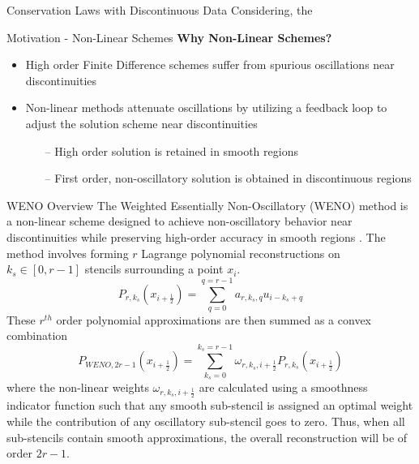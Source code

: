 \documentclass[9pt]{beamer}
\begin{document}
\begin{frame}{Conservation Laws with Discontinuous Data}
  Considering, the 
\end{frame}

\begin{frame}{Motivation - Non-Linear Schemes}
  \textbf{Why Non-Linear Schemes?}
  \begin{itemize}
  \item High order Finite Difference schemes suffer from spurious oscillations near discontinuities
  \item Non-linear methods attenuate oscillations by utilizing a feedback loop to adjust the solution scheme near discontinuities
  \begin{itemize}
  \item[--] High order solution is retained in smooth regions 
  \item[--] First order, non-oscillatory solution is obtained in discontinuous regions
  \end{itemize}
  \end{itemize}
  \end{frame}

\begin{frame}{WENO Overview}
  The Weighted Essentially Non-Oscillatory (WENO) method is a non-linear scheme designed to achieve non-oscillatory behavior near discontinuities while preserving high-order accuracy in smooth regions \cite{Jiang96}.  The method involves forming $r$ Lagrange polynomial reconstructions on $k_s\in[0,r-1]$ stencils surrounding a point $x_i$.
  \begin{equation}
  P_{r,k_s}(x_{i+\tfrac{1}{2}}) = \sum_{q=0}^{q=r-1}a_{r,k_s,q}u_{i-k_s+q}\label{eq:PolynomialReconstruction}
  \end{equation}
  These $r^{th}$ order polynomial approximations are then summed as a convex combination
  \begin{equation}
  P_{WENO, 2r-1}(x_{i+\frac{1}{2}})=\sum_{k_s=0}^{k_s=r-1}\omega_{r,k_s,i+\frac{1}{2}}P_{r,k_s}(x_{i+\tfrac{1}{2}})\label{eq:WenoEquation}
  \end{equation}
  where the non-linear weights $\omega_{r,k_s,i+\frac{1}{2}}$ are calculated using a smoothness indicator function such that any smooth sub-stencil is assigned an optimal weight while the contribution of any oscillatory sub-stencil goes to zero.  Thus, when all sub-stencils contain smooth approximations, the overall reconstruction will be of order $2r-1$.
  \end{frame}
\end{document}
